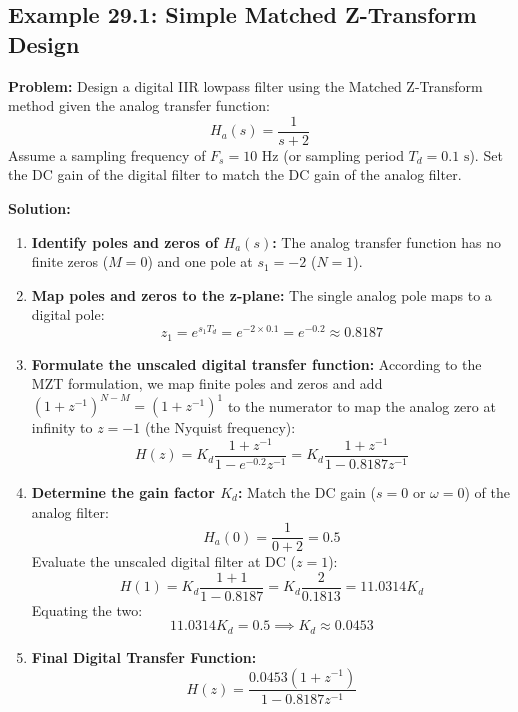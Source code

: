 \documentclass[11pt,a4paper]{article}
\begin{document}
\subsection*{Example 29.1: Simple Matched Z-Transform Design}
\textbf{Problem:} Design a digital IIR lowpass filter using the Matched Z-Transform method given the analog transfer function:
$$ H_a(s) = \frac{1}{s + 2} $$
Assume a sampling frequency of $F_s = 10 \text{ Hz}$ (or sampling period $T_d = 0.1 \text{ s}$). Set the DC gain of the digital filter to match the DC gain of the analog filter.

\textbf{Solution:}
\begin{enumerate}
\item \textbf{Identify poles and zeros of $H_a(s)$:}
   The analog transfer function has no finite zeros ($M=0$) and one pole at $s_1 = -2$ ($N=1$).
\item \textbf{Map poles and zeros to the z-plane:}
   The single analog pole maps to a digital pole:
   $$ z_1 = e^{s_1 T_d} = e^{-2 \times 0.1} = e^{-0.2} \approx 0.8187 $$
\item \textbf{Formulate the unscaled digital transfer function:}
   According to the MZT formulation, we map finite poles and zeros and add $(1 + z^{-1})^{N-M} = (1 + z^{-1})^1$ to the numerator to map the analog zero at infinity to $z = -1$ (the Nyquist frequency):
   $$ H(z) = K_d \frac{1 + z^{-1}}{1 - e^{-0.2} z^{-1}} = K_d \frac{1 + z^{-1}}{1 - 0.8187 z^{-1}} $$
\item \textbf{Determine the gain factor $K_d$:}
   Match the DC gain ($s=0$ or $\omega=0$) of the analog filter:
   $$ H_a(0) = \frac{1}{0 + 2} = 0.5 $$
   Evaluate the unscaled digital filter at DC ($z=1$):
   $$ H(1) = K_d \frac{1 + 1}{1 - 0.8187} = K_d \frac{2}{0.1813} = 11.0314 K_d $$
   Equating the two:
   $$ 11.0314 K_d = 0.5 \implies K_d \approx 0.0453 $$
\item \textbf{Final Digital Transfer Function:}
   $$ H(z) = \frac{0.0453(1 + z^{-1})}{1 - 0.8187 z^{-1}} $$
\end{enumerate}
\end{document}
